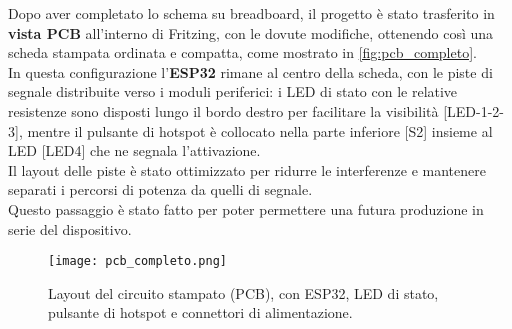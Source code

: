 Dopo aver completato lo schema su breadboard, il progetto è stato trasferito in \textbf{vista PCB} 
all’interno di Fritzing, con le dovute modifiche, ottenendo così una scheda stampata ordinata e compatta, come mostrato in \autoref{fig:pcb_completo}.\\ 
In questa configurazione l’\textbf{ESP32} rimane al centro della scheda, con le piste di segnale distribuite verso i moduli periferici: 
i LED di stato con le relative resistenze sono disposti lungo il bordo destro per facilitare la visibilità [LED-1-2-3], mentre il pulsante di hotspot 
è collocato nella parte inferiore [S2] insieme al LED [LED4] che ne segnala l’attivazione. \\
Il layout delle piste è stato ottimizzato per ridurre le interferenze e mantenere separati i percorsi di potenza da quelli di segnale.\\
Questo passaggio è stato fatto per poter permettere una futura produzione in serie del dispositivo.

\begin{figure}[H]
  \centering
  \texttt{[image: pcb\_completo.png]}
  \caption{Layout del circuito stampato (PCB), con ESP32, LED di stato, pulsante di hotspot e connettori di alimentazione.}
  \label{fig:pcb_completo}
\end{figure}
